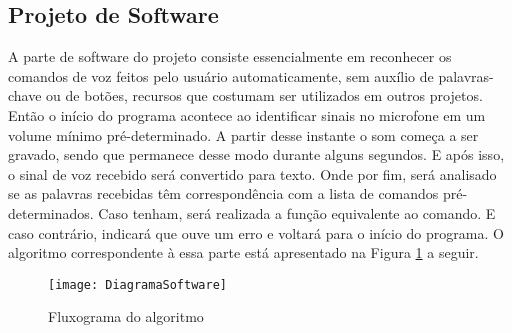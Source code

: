 \subsection{Projeto de Software}

A parte de software do projeto consiste essencialmente em reconhecer os comandos de voz feitos pelo usuário automaticamente, sem auxílio de palavras-chave ou de botões, recursos que costumam ser utilizados em outros projetos. Então o início do programa acontece ao identificar sinais no microfone em um volume mínimo pré-determinado. 
A partir desse instante o som começa a ser gravado, sendo que permanece desse modo durante alguns segundos. E após isso, o sinal de voz recebido será convertido para texto. Onde por fim, será analisado se as palavras recebidas têm correspondência com a lista de comandos pré-determinados. Caso tenham, será realizada a função equivalente ao comando. E caso contrário, indicará que ouve um erro e voltará para o início do programa.
O algoritmo correspondente à essa parte está apresentado na Figura \ref{fig-DiagramaSoftware} a seguir.

\begin{figure}[htbp]
	\centering
		\texttt{[image: DiagramaSoftware]}
	\caption{Fluxograma do algoritmo}
	\label{fig-DiagramaSoftware}
\end{figure}
